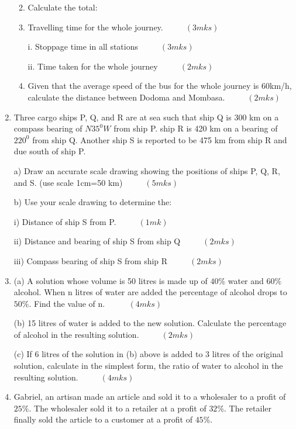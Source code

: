 \documentclass[
  a4paperpaper,
]{scrbook}
\begin{document}
\begin{tcolorbox}
\begin{enumerate}
  \begin{enumerate}
  \def\labelenumii{\alph{enumii})}
  \item
    Calculate the total:
  \item
    Travelling time for the whole journey. \(\hspace{1cm} (3mks)\)

    i. Stoppage time in all stations \(\hspace{1cm} (3mks)\)

    ii. Time taken for the whole journey \(\hspace{1cm} (2mks)\)
  \item
    Given that the average speed of the bus for the whole journey is
    60km/h, calculate the distance between Dodoma and Mombasa.
    \(\hspace{1cm} (2mks)\)
  \end{enumerate}
\item
  Three cargo ships P, Q, and R are at sea such that ship Q is 300 km on
  a compass bearing of \(N35^0W\) from ship P. ship R is 420 km on a
  bearing of \(220^0\) from ship Q. Another ship S is reported to be 475
  km from ship R and due south of ship P.

  a) Draw an accurate scale drawing showing the positions of ships P, Q,
  R, and S. (use scale 1cm=50 km) \(\hspace{1cm} (5mks)\)

  b) Use your scale drawing to determine the:

  i) Distance of ship S from P. \(\hspace{1cm} (1mk)\)

  ii) Distance and bearing of ship S from ship Q \(\hspace{1cm} (2mks)\)

  iii) Compass bearing of ship S from ship R \(\hspace{1cm} (2mks)\)
\item
  (a) A solution whose volume is 50 litres is made up of \(40\%\) water
  and \(60\%\) alcohol. When n litres of water are added the percentage
  of alcohol drops to \(50\%\). Find the value of
  n.~\(\hspace{1cm} (4mks)\)

  (b) 15 litres of water is added to the new solution. Calculate the
  percentage of alcohol in the resulting solution.
  \(\hspace{1cm} (2mks)\)

  (c) If 6 litres of the solution in (b) above is added to 3 litres of
  the original solution, calculate in the simplest form, the ratio of
  water to alcohol in the resulting solution. \(\hspace{1cm} (4mks)\)
\item
  Gabriel, an artisan made an article and sold it to a wholesaler to a
  profit of \(25\%\). The wholesaler sold it to a retailer at a profit
  of \(32\%\). The retailer finally sold the article to a customer at a
  profit of \(45\%\).


\end{enumerate}
\end{tcolorbox}
\end{document}
